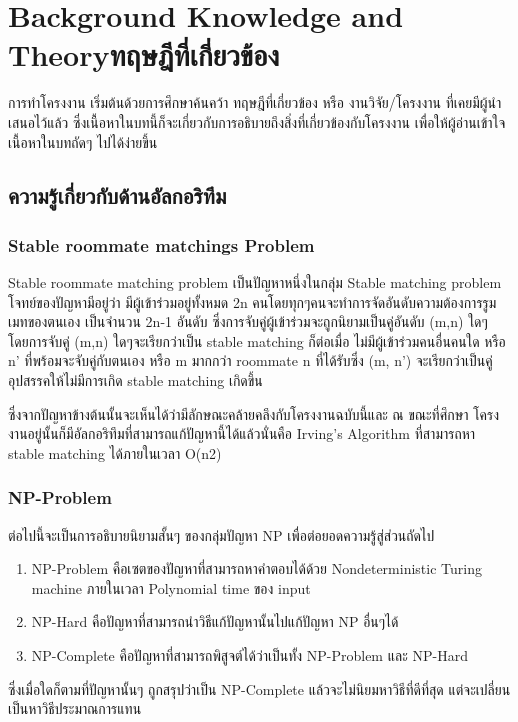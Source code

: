 \chapter{\ifenglish Background Knowledge and Theory\else ทฤษฎีที่เกี่ยวข้อง\fi}

การทำโครงงาน เริ่มต้นด้วยการศึกษาค้นคว้า ทฤษฎีที่เกี่ยวข้อง หรือ งานวิจัย/โครงงาน 
ที่เคยมีผู้นำเสนอไว้แล้ว ซึ่งเนื้อหาในบทนี้ก็จะเกี่ยวกับการอธิบายถึงสิ่งที่เกี่ยวข้องกับโครงงาน 
เพื่อให้ผู้อ่านเข้าใจเนื้อหาในบทถัดๆ ไปได้ง่ายขึ้น
\section{ความรู้เกี่ยวกับด้านอัลกอริทึม}
\subsection{Stable roommate matchings Problem}
Stable roommate matching problem เป็นปัญหาหนึ่งในกลุ่ม Stable matching problem
โจทย์ของปัญหามีอยู่ว่า มีผู้เข้าร่วมอยู่ทั้งหมด 2n คนโดยทุกๆคนจะทำการจัดอันดับความต้องการรูมเมทของตนเอง
เป็นจำนวน 2n-1 อันดับ ซึ่งการจับคู่ผู้เข้าร่วมจะถูกนิยามเป็นคู่อันดับ (m,n) ใดๆ โดยการจับคู่ (m,n) ใดๆจะเรียกว่าเป็น
stable matching ก็ต่อเมื่อ ไม่มีผู้เข้าร่วมคนอื่นคนใด หรือ n' ที่พร้อมจะจับคู่กับตนเอง หรือ m มากกว่า roommate n ที่ได้รับซึ่ง (m, n')
จะเรียกว่าเป็นคู่อุปสรรคให้ไม่มีการเกิด stable matching เกิดขึ้น 

ซึ่งจากปัญหาข้างต้นนั้นจะเห็นได้ว่ามีลักษณะคล้ายคลึงกับโครงงานฉบับนี้และ ณ ขณะที่ศึกษา
โครงงานอยู่นั้นก็มีอัลกอริทึมที่สามารถแก้ปัญหานี้ได้แล้วนั่นคือ Irving's Algorithm ที่สามารถหา 
stable matching ได้ภายในเวลา O(n2)
\subsection{NP-Problem}
ต่อไปนี้จะเป็นการอธิบายนิยามสั้นๆ ของกลุ่มปัญหา NP เพื่อต่อยอดความรู้สู่ส่วนถัดไป
\begin{enumerate}
  \item NP-Problem คือเซตของปัญหาที่สามารถหาคำตอบได้ด้วย Nondeterministic 
    Turing machine ภายในเวลา Polynomial time ของ input
  \item  NP-Hard คือปัญหาที่สามารถนำวิธีแก้ปัญหานั้นไปแก้ปัญหา NP อื่นๆได้
  \item  NP-Complete คือปัญหาที่สามารถพิสูจต์ได้ว่าเป็นทั้ง NP-Problem และ NP-Hard
\end{enumerate}
ซึ่งเมื่อใดก็ตามที่ปัญหานั้นๆ ถูกสรุปว่าเป็น NP-Complete แล้วจะไม่นิยมหาวิธีที่ดีที่สุด
แต่จะเปลี่ยนเป็นหาวิธีประมาณการแทน

